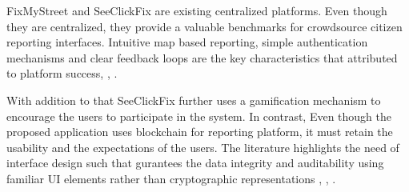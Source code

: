
FixMyStreet and SeeClickFix are existing centralized platforms. Even though they are centralized, they provide a valuable benchmarks for crowdsource citizen reporting interfaces. Intuitive map based reporting, simple authentication mechanisms and clear feedback loops are the key characteristics that attributed to platform success\cite{king2012fixmystreet}, \cite{seeclickfix2011democracy}, \cite{Matthews2018}.

With addition to that SeeClickFix further uses a gamification mechanism to encourage the users to participate in the system. In contrast, Even though the proposed application uses blockchain for reporting platform, it must retain the usability and the expectations of the users. The literature highlights the need of interface design such that gurantees the data integrity and auditability using familiar \ac{UI} elements rather than cryptographic representations \cite{adeyeye2025blockchain}, \cite{marian2025transparent}, \cite{nikonenko2025blockchain}.  




